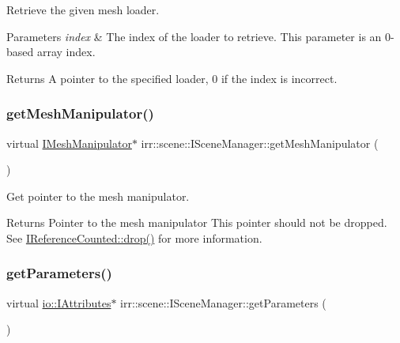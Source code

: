 Retrieve the given mesh loader. 


\begin{DoxyParams}{Parameters}
{\em index} & The index of the loader to retrieve. This parameter is an 0-\/based array index. \\
\hline
\end{DoxyParams}
\begin{DoxyReturn}{Returns}
A pointer to the specified loader, 0 if the index is incorrect. 
\end{DoxyReturn}
\mbox{\label{classirr_1_1scene_1_1ISceneManager_a05138d6b5f99fced0061794fb5c42318}} 
\subsubsection{\texorpdfstring{get\+Mesh\+Manipulator()}{getMeshManipulator()}}
{\footnotesize\ttfamily virtual \hyperlink{classirr_1_1scene_1_1IMeshManipulator}{I\+Mesh\+Manipulator}$\ast$ irr\+::scene\+::\+I\+Scene\+Manager\+::get\+Mesh\+Manipulator (\begin{DoxyParamCaption}{ }\end{DoxyParamCaption})\hspace{0.3cm}{\ttfamily [pure virtual]}}



Get pointer to the mesh manipulator. 

\begin{DoxyReturn}{Returns}
Pointer to the mesh manipulator This pointer should not be dropped. See \hyperlink{classirr_1_1IReferenceCounted_a03856a09355b89d178090c4a5f738543}{I\+Reference\+Counted\+::drop()} for more information. 
\end{DoxyReturn}
\mbox{\label{classirr_1_1scene_1_1ISceneManager_a4dba8ee7f48fdf6ede2c3f4b5fabcad3}} 
\subsubsection{\texorpdfstring{get\+Parameters()}{getParameters()}}
{\footnotesize\ttfamily virtual \hyperlink{classirr_1_1io_1_1IAttributes}{io\+::\+I\+Attributes}$\ast$ irr\+::scene\+::\+I\+Scene\+Manager\+::get\+Parameters (\begin{DoxyParamCaption}{ }\end{DoxyParamCaption})\hspace{0.3cm}{\ttfamily [pure virtual]}}



